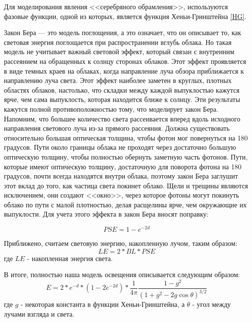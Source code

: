 Для моделирования явления <<серебряного обрамления>>, используются фазовые функции, одной из которых, является функция Хеньи-Гринштейна \eqref{HG}.

Закон Бера — это модель поглощения, а это означает, что он описывает то, как световая энергия поглощается при распространении вглубь облака. Но такая модель не учитывает важный световой эффект, который связан с внутренним рассеянием на обращенных к солнцу сторонах облаков. Этот эффект проявляется в виде темных краев на облаках, когда направление луча обзора приближается к направлению луча света. Этот эффект наиболее заметен в круглых, плотных областях облаков, настолько, что складки между каждой выпуклостью кажутся ярче, чем сама выпуклость, которая находится ближе к солнцу. Эти результаты кажутся полной противоположностью тому, что моделирует закон Бера.  Напомним, что большее количество света рассеивается вперед вдоль исходного направления светового луча из-за прямого рассеяния. Должна существовать относительно большая оптическая толщина, чтобы фотон мог повернуться на 180 градусов. Пути около границы облака не проходят через достаточно большую оптическую толщину, чтобы полностью обернуть заметную часть фотонов. Пути, которые имеют оптическую толщину, достаточную для поворота фотона на 180 градусов, почти всегда находятся внутри облака, поэтому закон Бера заглушит этот вклад до того, как частица света покинет облако. Щели и трещины являются исключением, они создают <<окно>>, через которое фотоны могут покинуть облако по пути с малой плотностью, делая расщелины ярче, чем окружающие их выпуклости. Для учета этого эффекта в закон Бера вносят поправку:

\begin{equation}
	\label{sugar_powder}
	PSE = 1 - e ^ {-2 d}
\end{equation}

Приближено, считаем световую энергию, накопленную лучом, таким образом:
\begin{equation}
	\label{bsp}
	LE = 2 * BL * PSE
\end{equation}
где $ LE $ - накопленная энергия света. 

В итоге, полностью наша модель освещения описывается следующим образом:
\begin{equation}
	\label{light_model}
	E = 2 * e ^ {-d} * (1 - 2 e ^ {-2d}) * \frac{1}{4\pi} \frac{1 - g^2}{(1 + g^2 - 2g\cos \theta)^{3/2}}
\end{equation}
где $ g $ - некоторая константа в функции Хеньи-Гринштейна, а $ \theta $ - угол между лучами взгляда и света.

